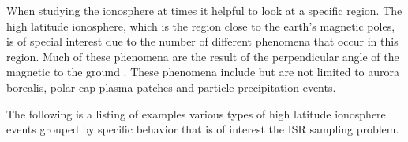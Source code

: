 
%
% 
%

When studying the ionosphere at times it helpful to look at a specific region. The high latitude ionosphere, which is the region close to the earth's magnetic poles, is of special interest due to the number of different phenomena that occur in this region. Much of these phenomena are the result of the perpendicular angle of the magnetic to the ground \cite{schunk2004ionospheres}. These phenomena include but are not limited to aurora borealis, polar cap plasma patches and particle precipitation events. 

The following is a listing of examples various types of high latitude ionosphere events grouped by specific behavior that is of interest the ISR sampling problem.

